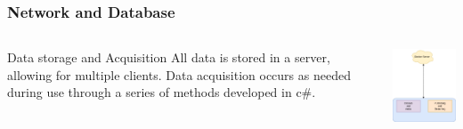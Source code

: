 \documentclass[aspectratio=169]{beamer}
\begin{document}
\begin{frame}
    \frametitle{Network and Database}

    \begin{columns}
        \begin{column}{0.48\textwidth}
            \begin{block}{Data storage and Acquisition}
                All data is stored in a server, allowing for multiple clients. Data acquisition occurs as needed during use through a series of methods developed in c\#.
            \end{block}
        \end{column}
        \begin{column}{0.48\textwidth}
            \includegraphics[width=5cm]{Simple Diagram.png}
        \end{column}
    \end{columns}

\end{frame}
\end{document}
